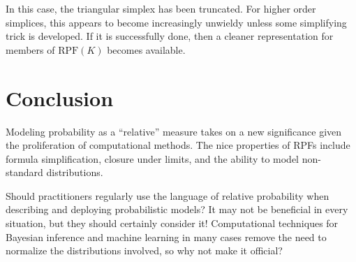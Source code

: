 \documentclass[twoside]{article}
\theoremstyle{plain}%
\theoremstyle{definition}
\theoremstyle{remark}
\begin{document}
In this case, the triangular simplex has been truncated. For higher order simplices, this appears to become increasingly unwieldy unless some simplifying trick is developed. If it is successfully done, then a cleaner representation for members of \(\text{RPF}(K)\) becomes available.

\section{Conclusion}

Modeling probability as a ``relative'' measure takes on a new significance given the proliferation of computational methods. The nice properties of RPFs include formula simplification, closure under limits, and the ability to model non-standard distributions.

Should practitioners regularly use the language of relative probability when describing and deploying probabilistic models? It may not be beneficial in every situation, but they should certainly consider it! Computational techniques for Bayesian inference and machine learning in many cases remove the need to normalize the distributions involved, so why not make it official?
\end{document}
